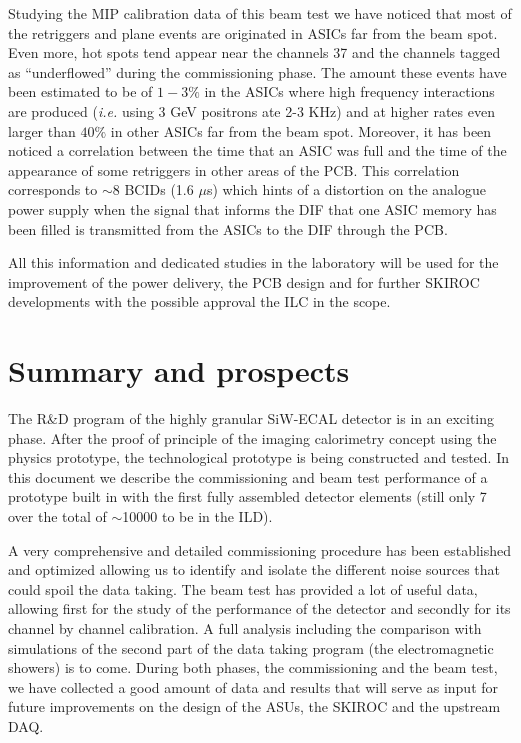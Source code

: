 \documentclass[a4paper,11pt]{article}
\begin{document}
Studying the MIP calibration data of this beam test we have noticed that most of the retriggers and plane events are originated 
in
ASICs far from the beam spot. Even more, hot spots tend appear near the channels 37 and the channels tagged as ``underflowed'' 
during
the commissioning phase. The amount these events have been estimated to be of $1-3\%$ in the ASICs where high frequency
interactions are produced ({\it i.e.} using 3 GeV positrons ate 2-3 KHz) and at higher rates even larger than $40\%$ in other 
ASICs far from the beam spot.
Moreover, it has been noticed a correlation between the time that an ASIC was full and the time of the appearance of some 
retriggers in other areas of the PCB. 
This correlation corresponds to $\sim8$ BCIDs (1.6 $\mu$s) which hints
of a distortion on the analogue power supply when
the signal that informs the DIF that one ASIC memory has been filled is transmitted from the ASICs to
the DIF through the PCB.


All this information and dedicated studies in the laboratory will be used for the
improvement of the power delivery, the PCB design and for further SKIROC developments 
with the possible approval the ILC in the scope.


\section{Summary and prospects}
\label{sec:prospects}

The R\&D program of the highly granular SiW-ECAL detector is in an exciting phase. 
After the proof of principle of the imaging calorimetry concept using the physics prototype, the 
technological prototype is being constructed and tested. In this document we describe the commissioning and
beam test performance of a prototype built in with the first fully assembled
detector elements (still only 7 over the total of $\sim$10000 to be in the ILD).

A very comprehensive and detailed commissioning procedure has been established and optimized
allowing us to identify and isolate the different noise sources that could spoil the data taking.
The beam test has provided a lot of useful data, allowing first for the study of 
the performance of the detector and secondly 
for its channel by channel calibration. 
A full analysis including the comparison with simulations of the 
second part of the data taking program (the electromagnetic showers) is to come.
During both phases, the commissioning and the beam test,
we have collected a good amount of data and results
that will serve as input for future improvements on
the design of the ASUs, the SKIROC and the upstream DAQ.
\end{document}
